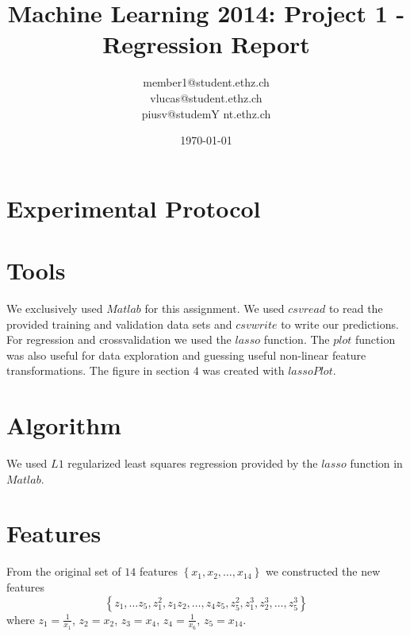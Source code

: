 \documentclass[a4paper, 11pt]{article}
\title{Machine Learning 2014: Project 1 - Regression Report}
\author{member1@student.ethz.ch\\vlucas@student.ethz.ch\\ piusv@studemY nt.ethz.ch\\}
\date{\today}
\begin{document}
\maketitle

\section*{Experimental Protocol}

\section{Tools}

We exclusively used $Matlab$ for this assignment.
We used $csvread$ to read the provided training and validation data sets and
$csvwrite$ to write our predictions. For regression and crossvalidation we used
the $lasso$ function. The $plot$ function was also useful for data exploration
and guessing useful non-linear feature transformations. The figure in section $4$
was created with $lassoPlot$.


\section{Algorithm}
We used $L1$ regularized least squares regression provided by the $lasso$ function in $Matlab$.

\section{Features}

From the original set of $14$ features $\left\{x_1, x_2, \ldots, x_{14} \right\}$
we constructed the new features
\[
\left\{z_1, \ldots z_5, z_{1}^{2}, z_1z_2, \ldots, z_4z_5, z_{5}^{2}, z_{1}^{3}, z_{2}^{3}, \ldots, z_{5}^{3} \right\}
\]
where $z_1 = \frac{1}{x_1}$, $z_2 = x_2$, $z_3 = x_4$, $z_4 = \frac{1}{x_6}$, $z_5 = x_{14}$.
\end{document}
